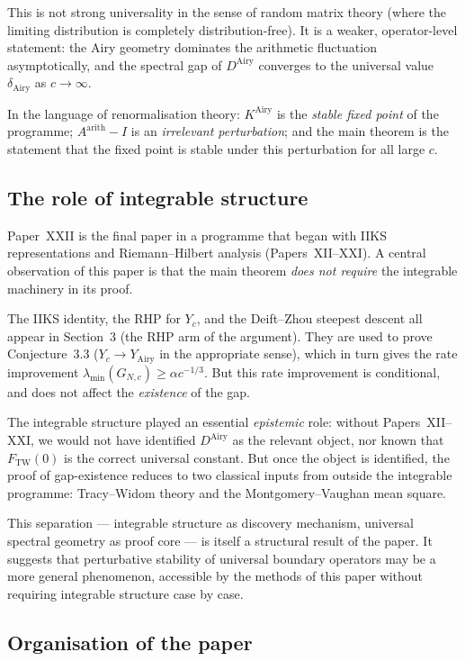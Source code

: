 \documentclass[12pt,a4paper]{amsart}
\newcommand{\DAi}{D^{\mathrm{Airy}}}
\newcommand{\KAi}{K^{\mathrm{Airy}}}
\newcommand{\Aarith}{A^{\mathrm{arith}}}
\begin{document}
This is not strong universality in the sense of random matrix theory
(where the limiting distribution is completely distribution-free).
It is a weaker, operator-level statement:
the Airy geometry dominates the arithmetic fluctuation asymptotically,
and the spectral gap of $\DAi$ converges to the universal value
$\delta_{\mathrm{Airy}}$ as $c \to \infty$.

In the language of renormalisation theory:
$\KAi$ is the \emph{stable fixed point} of the programme;
$\Aarith - I$ is an \emph{irrelevant perturbation};
and the main theorem is the statement that the fixed point is stable
under this perturbation for all large $c$.

\subsection*{The role of integrable structure}

Paper~XXII is the final paper in a programme that began with
IIKS representations and Riemann--Hilbert analysis (Papers~XII--XXI).
A central observation of this paper is that the main theorem
\emph{does not require} the integrable machinery in its proof.

The IIKS identity, the RHP for $Y_c$, and the Deift--Zhou
steepest descent all appear in Section~3 (the RHP arm of the argument).
They are used to prove Conjecture~3.3
($Y_c \to Y_{\mathrm{Airy}}$ in the appropriate sense),
which in turn gives the rate improvement $\lambda_{\min}(G_{N,c}) \ge \alpha c^{-1/3}$.
But this rate improvement is conditional, and does not affect the
\emph{existence} of the gap.

The integrable structure played an essential \emph{epistemic} role:
without Papers~XII--XXI, we would not have identified $\DAi$ as the
relevant object, nor known that $F_{\mathrm{TW}}(0)$ is the correct
universal constant.
But once the object is identified, the proof of gap-existence
reduces to two classical inputs from outside the integrable programme:
Tracy--Widom theory and the Montgomery--Vaughan mean square.

This separation --- integrable structure as discovery mechanism,
universal spectral geometry as proof core --- is itself a structural
result of the paper.
It suggests that perturbative stability of universal boundary operators
may be a more general phenomenon, accessible by the methods of
this paper without requiring integrable structure case by case.

\subsection*{Organisation of the paper}
\end{document}
